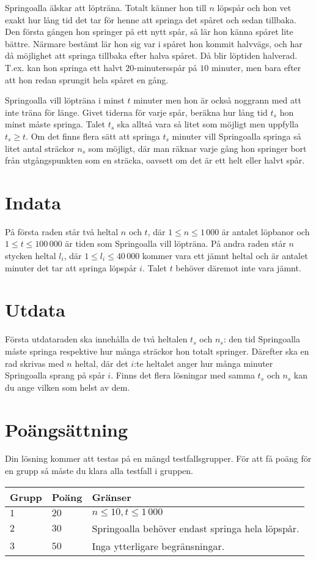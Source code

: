 Springoalla älskar att löpträna.
Totalt känner hon till $n$ löpspår och hon vet exakt hur lång tid det tar för henne att springa det spåret och sedan tillbaka.
Den första gången hon springer på ett nytt spår, så lär hon känna spåret lite bättre.
Närmare bestämt lär hon sig var i spåret hon kommit halvvägs, och har då möjlighet att springa tillbaka efter halva spåret.
Då blir löptiden halverad.
T.ex. kan hon springa ett halvt $20$-minutersspår på $10$ minuter, men bara efter att hon redan sprungit hela spåret en gång.

Springoalla vill löpträna i minst $t$ minuter men hon är också noggrann med att inte träna för länge.
Givet tiderna för varje spår, beräkna hur lång tid $t_s$ hon minst måste springa.
Talet $t_s$ ska alltså vara så litet som möjligt men uppfylla $t_s \ge t$.
Om det finns flera sätt att springa $t_s$ minuter vill Springoalla springa så litet antal sträckor $n_s$ som möjligt, där man räknar varje gång hon springer bort från utgångspunkten som en sträcka, oavsett om det är ett helt eller halvt spår.

\section*{Indata}
På första raden står två heltal $n$ och $t$, där $1 \le n \le 1\,000$ är antalet löpbanor och $1 \le t \le 100\,000$ är tiden som Springoalla vill löpträna.
På andra raden står $n$ stycken heltal $l_i$, där $1 \le l_i \le 40\,000$ kommer vara ett jämnt heltal och är antalet minuter det tar att springa löpspår $i$.
Talet $t$ behöver däremot inte vara jämnt.

\section*{Utdata}
Första utdataraden ska innehålla de två heltalen $t_s$ och $n_s$: den tid Springoalla måste springa respektive hur många sträckor hon totalt springer.
Därefter ska en rad skrivas med $n$ heltal, där det $i$:te heltalet anger hur många minuter Springoalla sprang på spår $i$.
Finns det flera lösningar med samma $t_s$ och $n_s$ kan du ange vilken som helst av dem.

\section*{Poängsättning}
Din lösning kommer att testas på en mängd testfallsgrupper.
För att få poäng för en grupp så måste du klara alla testfall i gruppen.

\noindent
\begin{tabular}{| l | l | p{12cm} |}
  \hline
  \textbf{Grupp} & \textbf{Poäng} & \textbf{Gränser} \\ \hline
  $1$    & $20$        & $n \le 10, t \le 1\,000$ \\ \hline 
  $2$    & $30$        & Springoalla behöver endast springa hela löpspår. \\ \hline
  $3$    & $50$        & Inga ytterligare begränsningar. \\ \hline 
\end{tabular}

